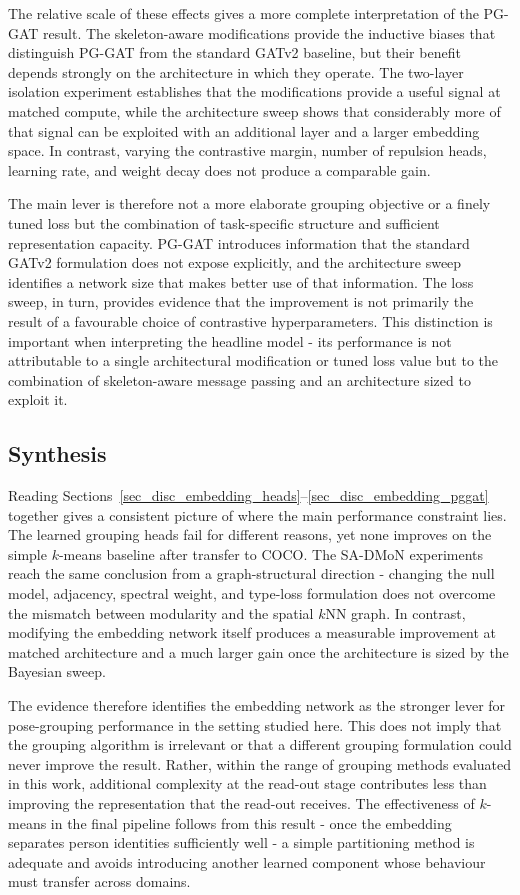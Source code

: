 The relative scale of these effects gives a more complete interpretation
of the PG-GAT result.
The skeleton-aware modifications provide the inductive biases that
distinguish PG-GAT from the standard GATv2 baseline,
but their benefit depends strongly on the architecture in which they
operate.
The two-layer isolation experiment establishes that the modifications
provide a useful signal at matched compute,
while the architecture sweep shows that considerably more of that signal
can be exploited with an additional layer and a larger embedding space.
In contrast, varying the contrastive margin,
number of repulsion heads,
learning rate,
and weight decay does not produce a comparable gain.

The main lever is therefore not a more elaborate grouping objective
or a finely tuned loss
but the combination of task-specific structure and sufficient
representation capacity.
PG-GAT introduces information that the standard GATv2 formulation does
not expose explicitly,
and the architecture sweep identifies a network size that makes better
use of that information.
The loss sweep, in turn, provides evidence that the improvement is not
primarily the result of a favourable choice of contrastive
hyperparameters.
This distinction is important when interpreting the headline model -
its performance is not attributable to a single architectural
modification or tuned loss value
but to the combination of skeleton-aware message passing and an
architecture sized to exploit it.

\subsection{Synthesis}
\label{sec_disc_embedding_synthesis}

Reading Sections~\ref{sec_disc_embedding_heads}--\ref{sec_disc_embedding_pggat}
together gives a consistent picture of where the main performance
constraint lies.
The learned grouping heads fail for different reasons,
yet none improves on the simple $k$-means baseline after transfer to
COCO.
The SA-DMoN experiments reach the same conclusion from a graph-structural
direction -
changing the null model,
adjacency,
spectral weight,
and type-loss formulation does not overcome the mismatch between
modularity and the spatial $k$NN graph.
In contrast, modifying the embedding network itself produces a measurable
improvement at matched architecture and a much larger gain once the
architecture is sized by the Bayesian sweep.

The evidence therefore identifies the embedding network as the stronger
lever for pose-grouping performance in the setting studied here.
This does not imply that the grouping algorithm is irrelevant
or that a different grouping formulation could never improve the result.
Rather, within the range of grouping methods evaluated in this work,
additional complexity at the read-out stage contributes less than
improving the representation that the read-out receives.
The effectiveness of $k$-means in the final pipeline follows from this
result -
once the embedding separates person identities sufficiently well -
a simple partitioning method is adequate and avoids introducing another
learned component whose behaviour must transfer across domains.

